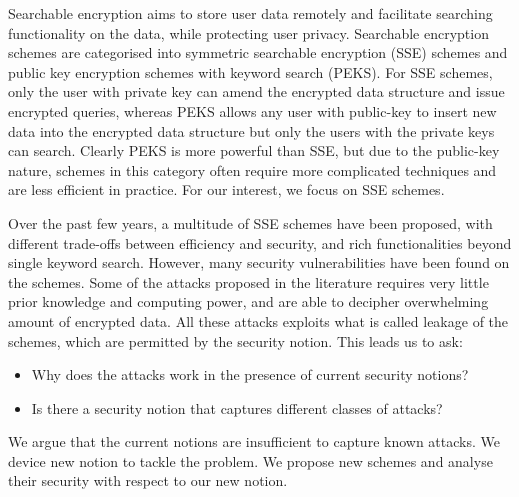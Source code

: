 Searchable encryption aims to store user data remotely and facilitate searching functionality on the data, while protecting user privacy. Searchable encryption schemes are categorised into symmetric searchable encryption (SSE) schemes and public key encryption schemes with keyword search (PEKS). For SSE schemes, only the user with private key can amend the encrypted data structure and issue encrypted queries, whereas PEKS allows any user with public-key to insert new data into the encrypted data structure but only the users with the private keys can search. Clearly PEKS is more powerful than SSE, but due to the public-key nature, schemes in this category often require more complicated techniques and are less efficient in practice. For our interest, we focus on SSE schemes.


Over the past few years, a multitude of SSE schemes have been proposed, with different trade-offs between efficiency and security, and rich functionalities beyond single keyword search. However, many security vulnerabilities have been found on the schemes. Some of the attacks proposed in the literature requires very little prior knowledge and computing power, and are able to decipher overwhelming amount of encrypted data. All these attacks exploits what is called leakage of the schemes, which are permitted by the security notion. This leads us to ask:

\begin{itemize}
	\item Why does the attacks work in the presence of current security notions?
	\item Is there a security notion that captures different classes of attacks?
\end{itemize}

We argue that the current notions are insufficient to capture known attacks. We device new notion to tackle the problem. We propose new schemes and analyse their security with respect to our new notion.